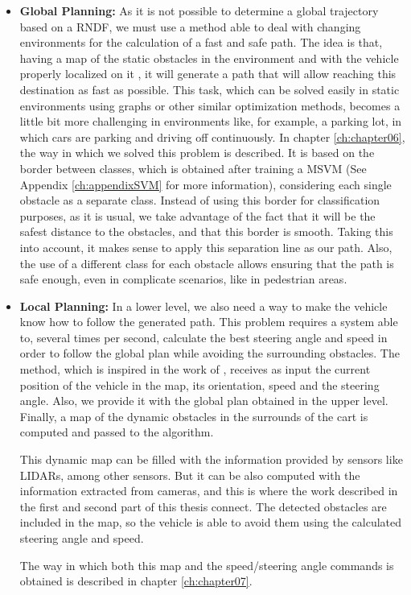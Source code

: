 \begin{itemize}
 \item \textbf{Global Planning:}
 As it is not possible to determine a global trajectory based on a \ac{RNDF}, we must use a method able to deal with changing environments for the calculation of a fast and safe path. The idea is that, having a map of the static obstacles in the environment and with the vehicle properly localized on it \citep{Perea2013mcl}, it will generate a path that will allow reaching this destination as fast as possible. This task, which can be solved easily in static environments using graphs or other similar optimization methods, becomes a little bit more challenging in environments like, for example, a parking lot, in which cars are parking and driving off continuously.
 In chapter \ref{ch:chapter06}, the way in which we solved this problem is described. It is based on the border between classes, which is obtained after training a \ac{MSVM} (See Appendix \ref{ch:appendixSVM} for more information), considering each single obstacle as a separate class. Instead of using this border for classification purposes, as it is usual, we take advantage of the fact that it will be the safest distance to the obstacles, and that this border is smooth. Taking this into account, it makes sense to apply this separation line as our path. Also, the use of a different class for each obstacle allows ensuring that the path is safe enough, even in complicate scenarios, like in pedestrian areas.
 
 \item \textbf{Local Planning:}
 In a lower level, we also need a way to make the vehicle know how to follow the generated path. This problem requires a system able to, several times per second, calculate the best steering angle and speed in order to follow the global plan while avoiding the surrounding obstacles. The method, which is inspired in the work of \cite{chu2012local}, receives as input the current position of the vehicle in the map, its orientation, speed and the steering angle. Also, we provide it with the global plan obtained in the upper level. Finally, a map of the dynamic obstacles in the surrounds of the cart is computed and passed to the algorithm.
 
 This dynamic map can be filled with the information provided by sensors like \acp{LIDAR}, among other sensors. But it can be also computed with the information extracted from cameras, and this is where the work described in the first and second part of this thesis connect. The detected obstacles are included in the map, so the vehicle is able to avoid them using the calculated steering angle and speed.
 
 The way in which both this map and the speed/steering angle commands is obtained is described in chapter \ref{ch:chapter07}.
\end{itemize}
 
